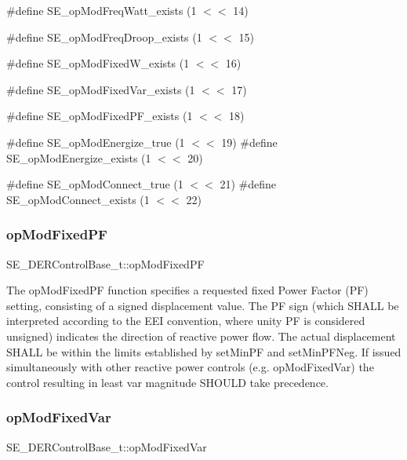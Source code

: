 \#define S\+E\+\_\+op\+Mod\+Freq\+Watt\+\_\+exists (1 $<$$<$ 14)

\#define S\+E\+\_\+op\+Mod\+Freq\+Droop\+\_\+exists (1 $<$$<$ 15)

\#define S\+E\+\_\+op\+Mod\+Fixed\+W\+\_\+exists (1 $<$$<$ 16)

\#define S\+E\+\_\+op\+Mod\+Fixed\+Var\+\_\+exists (1 $<$$<$ 17)

\#define S\+E\+\_\+op\+Mod\+Fixed\+P\+F\+\_\+exists (1 $<$$<$ 18)

\#define S\+E\+\_\+op\+Mod\+Energize\+\_\+true (1 $<$$<$ 19) \#define S\+E\+\_\+op\+Mod\+Energize\+\_\+exists (1 $<$$<$ 20)

\#define S\+E\+\_\+op\+Mod\+Connect\+\_\+true (1 $<$$<$ 21) \#define S\+E\+\_\+op\+Mod\+Connect\+\_\+exists (1 $<$$<$ 22) \mbox{\label{group__DERControlBase_ga1bf6e505bc8ec7cd081352a3c451f04a}} 
\subsubsection{\texorpdfstring{op\+Mod\+Fixed\+PF}{opModFixedPF}}
{\footnotesize\ttfamily S\+E\+\_\+\+D\+E\+R\+Control\+Base\+\_\+t\+::op\+Mod\+Fixed\+PF}

The op\+Mod\+Fixed\+PF function specifies a requested fixed Power Factor (PF) setting, consisting of a signed displacement value. The PF sign (which S\+H\+A\+LL be interpreted according to the E\+EI convention, where unity PF is considered unsigned) indicates the direction of reactive power flow. The actual displacement S\+H\+A\+LL be within the limits established by set\+Min\+PF and set\+Min\+P\+F\+Neg. If issued simultaneously with other reactive power controls (e.\+g. op\+Mod\+Fixed\+Var) the control resulting in least var magnitude S\+H\+O\+U\+LD take precedence. \mbox{\label{group__DERControlBase_ga4adf111637bfacae44bdc13b01705a22}} 
\subsubsection{\texorpdfstring{op\+Mod\+Fixed\+Var}{opModFixedVar}}
{\footnotesize\ttfamily S\+E\+\_\+\+D\+E\+R\+Control\+Base\+\_\+t\+::op\+Mod\+Fixed\+Var}

